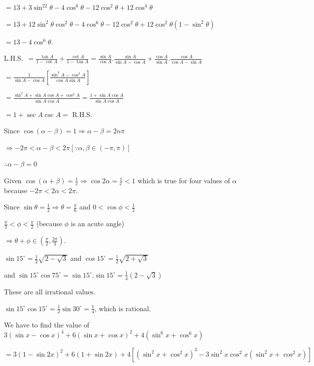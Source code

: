   $= 13 + 3\sin^22\theta - 4\cos^6\theta - 12\cos^2\theta + 12\cos^4\theta$

  $= 13 + 12\sin^2\theta\cos^2\theta - 4\cos^6\theta - 12\cos^2\theta + 12\cos^2\theta\left(1
  - \sin^2\theta\right)$

  $= 13 - 4\cos^6\theta$.
\item L.H.S.\ $= \frac{\tan A}{1 - \cot A} + \frac{\cot A}{1 - \tan A} = \frac{\sin A}{\cos A}.\frac{\sin
  A}{\sin A - \cos A} + \frac{\cos A}{\sin A}.\frac{\cos A}{\cos A - \sin A}$

  $= \frac{1}{\sin A - \cos A}\left[\frac{\sin^3 A - \cos^3A}{\cos A\sin A}\right]$

  $= \frac{\sin^2A + \sin A \cos A + \cos^2A}{\sin A\cos A} = \frac{1 + \sin A\cos A}{\sin A\cos A}$

  $= 1 + \sec A\csc A =$ R.H.S.
\item Since $\cos(\alpha - \beta) = 1\Rightarrow \alpha - \beta = 2n\pi$

  $\Rightarrow -2\pi < \alpha - \beta < 2\pi[\because \alpha, \beta\in(-\pi, \pi)]$

  $\therefore \alpha - \beta = 0$

  Given $\cos(\alpha + \beta) = \frac{1}{e}\Rightarrow \cos2\alpha = \frac{1}{e} < 1$ which is true for four
  values of $\alpha$ because $-2\pi < 2\alpha < 2\pi$.
\item Since $\sin\theta = \frac{1}{2} \Rightarrow \theta = \frac{\pi}{6}$ and $0 < \cos\phi < \frac{1}{2}$

  $\frac{\pi}{3} < \phi < \frac{\pi}{2}$ (because $\phi$ is an acute angle)

  $\Rightarrow \theta + \phi\in\left(\frac{\pi}{2}, \frac{2\pi}{3}\right)$.
\item $\sin15^\circ = \frac{1}{2}\sqrt{2 - \sqrt{3}}$ and $\cos15^\circ = \frac{1}{2}\sqrt{2 + \sqrt{3}}$

  and $\sin15^\circ\cos75^\circ = \sin15^\circ.\sin15^\circ = \frac{1}{4}\left(2 - \sqrt{3}\right)$

  These are all irrational values.

  $\sin15^\circ\cos15^\circ = \frac{1}{2}\sin30^\circ = \frac{1}{4}$, which is rational.
\item We have to find the value of $3(\sin x - \cos x)^4 + 6(\sin x + \cos x)^2 + 4\left(\sin^6x
  + \cos^6x\right)$

  $= 3(1- \sin2x)^2 + 6(1 + \sin2x) + 4\left[\left(\sin^2x + \cos^2x\right)^3 -
    3\sin^2x\cos^2x\left(\sin^2x + \cos^2x\right)\right]$

